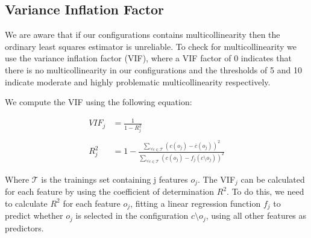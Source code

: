 


\subsection{Variance Inflation Factor}

We are aware that if our configurations contains multicollinearity then the ordinary least squares estimator is unreliable.
To check for multicollinearity we use the variance inflation factor (VIF), where a VIF factor of 0 indicates
that there is no multicollinearity in our configurations and the thresholds of 5 and 10 indicate moderate and highly problematic multicollinearity 
respectively. \cite{Multicollinearity}

We compute the VIF using the following equation:

\begin{align}
    VIF_{j} &= \frac{1}{1 - R^{2}_{j}}  \\ \nonumber\\
    R^{2}_{j} &= 1 - \frac{\sum\limits_{\forall c \in \mathcal{T}} (c(o_j) - \overline{c}(o_j))^2} {\sum\limits_{\forall c \in \mathcal{T}}(c(o_j) - f_j(c \setminus o_j))^2}
\end{align}

Where $\mathcal{T}$ is the trainings set containing j features $o_j$. The VIF$_{j}$ can be calculated for each feature by using the coefficient
of determination $R^2$. To do this, we need to calculate $R^2$ for each feature $o_j$, fitting a linear regression function $f_j$ to predict whether $o_j$
is selected in the configuration $c \setminus o_j$, using all other features as predictors. \cite{Multicollinearity}
